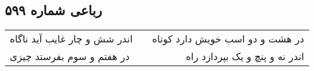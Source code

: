 \begin{center}
\section*{رباعی شماره ۵۹۹}
\label{sec:sh599}
\begin{longtable}{l p{0.5cm} r}
اندر شش و چار غایب آید ناگاه
&&
در هشت و دو اسب خویش دارد کوتاه
\\
در هفتم و سوم بفرستد چیزی
&&
اندر نه و پنچ و یک بپردازد راه
\\
\end{longtable}
\end{center}
